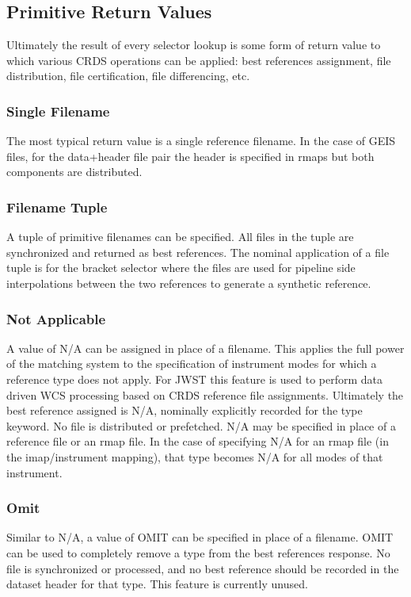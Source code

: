 \documentclass[letterpaper,10pt,english]{sphinxmanual}
\begin{document}
\subsection{Primitive Return Values}
\label{rmap_syntax:primitive-return-values}
Ultimately the result of every selector lookup is some form of return value to
which various CRDS operations can be applied: best references assignment, file
distribution, file certification, file differencing, etc.


\subsubsection{Single Filename}
\label{rmap_syntax:single-filename}
The most typical return value is a single reference filename.  In the case of
GEIS files, for the data+header file pair the header is specified in rmaps but
both components are distributed.


\subsubsection{Filename Tuple}
\label{rmap_syntax:filename-tuple}
A tuple of primitive filenames can be specified.  All files in the tuple are
synchronized and returned as best references.  The nominal application of a
file tuple is for the bracket selector where the files are used for pipeline
side interpolations between the two references to generate a synthetic
reference.


\subsubsection{Not Applicable}
\label{rmap_syntax:not-applicable}
A value of N/A can be assigned in place of a filename.  This applies the full
power of the matching system to the specification of instrument modes for which
a reference type does not apply.  For JWST this feature is used to perform data
driven WCS processing based on CRDS reference file assignments.  Ultimately the
best reference assigned is N/A, nominally explicitly recorded for the type
keyword.  No file is distributed or prefetched.  N/A may be specified in place
of a reference file or an rmap file.  In the case of specifying N/A for an rmap
file (in the imap/instrument mapping), that type becomes N/A for all modes of
that instrument.


\subsubsection{Omit}
\label{rmap_syntax:omit}
Similar to N/A, a value of OMIT can be specified in place of a filename.  OMIT
can be used to completely remove a type from the best references response.  No
file is synchronized or processed, and no best reference should be recorded in
the dataset header for that type.  This feature is currently unused.
\end{document}
